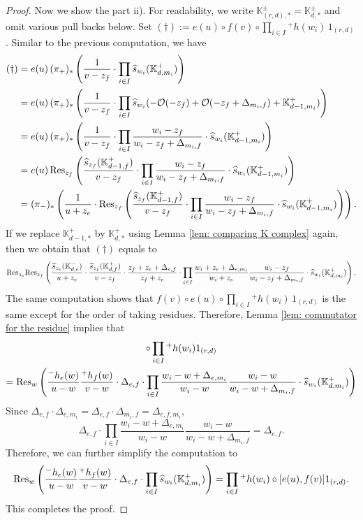 \documentclass[10pt]{amsart}
\newcommand{\BK}{\mathbb{K}}
\newcommand{\CO}{\mathcal{O}}
\newcommand{\+}{{}^+}
\newcommand{\Res}{\textnormal{Res}}
\theoremstyle{definition}
\theoremstyle {definition}
\theoremstyle {definition}
\begin{document}
\begin{proof}
Now we show the part ii). For readability, we write $\BK^\pm_{(r,d),*}=\BK^\pm_{d,*}$ and omit various pull backs below. Set $(\dagger):=e(u)\circ f(v)\circ \prod_{i\in I} {}^{+}h(w_i)\, 1_{(r,d)}$. Similar to the previous computation, we have
\begin{align*}
    (\dagger)
    &=e(u)\,(\pi_+)_*\left(\frac{1}{v-z_f}\cdot \prod_{i\in I} \widehat s_{w_i}(\BK^{+}_{d,m_i})
    \right)\\
    &=e(u)\,(\pi_+)_*\left(\frac{1}{v-z_f}\cdot \prod_{i\in I} 
    \widehat s_{w_i}(-\CO(-z_f)+\CO(-z_f+\Delta_{m_i,f})+\BK^{+}_{d-1,m_i})
    \right)\\
    &=e(u)\,(\pi_+)_*\left(\frac{1}{v-z_f}\cdot \prod_{i\in I} 
    \frac{w_i-z_f}{w_i-z_f+\Delta_{m_i,f}}
    \cdot \widehat s_{w_i}(\BK^{+}_{d-1,m_i})
    \right)\\
    &=e(u)\,\Res_{z_f}\left(\frac{\widehat s_{z_f}(\BK^+_{d-1,f})}{v-z_f}\cdot \prod_{i\in I} 
    \frac{w_i-z_f}{w_i-z_f+\Delta_{m_i,f}}
    \cdot \widehat s_{w_i}(\BK^{+}_{d-1,m_i})
    \right)\\
    &=(\pi_-)_*\left(
    \frac{1}{u+z_e}
    \cdot \Res_{z_f}\left(\frac{\widehat s_{z_f}(\BK^+_{d-1,f})}{v-z_f}\cdot \prod_{i\in I} 
    \frac{w_i-z_f}{w_i-z_f+\Delta_{m_i,f}}
    \cdot \widehat s_{w_i}(\BK^{+}_{d-1,m_i})
    \right)
    \right).
\end{align*}
If we replace $\BK^+_{d-1,*}$ by $\BK^+_{d,*}$ using Lemma \ref{lem: comparing K complex} again, then we obtain that $(\dagger)$ equals to 
$$\Res_{z_e}\Res_{z_f}\left(
    \frac{\widehat s_{z_e}(\BK^-_{d,e})}{u+z_e}\cdot \frac{\widehat s_{z_f}(\BK^+_{d,f})}{v-z_f}\cdot \frac{z_f+z_e+\Delta_{e,f}}{z_f+z_e}\cdot 
    \prod_{i\in I} 
    \frac{w_i+z_e+\Delta_{e,m_i}}{w_i+z_e}\frac{w_i-z_f}{w_i-z_f+\Delta_{m_i,f}}
    \cdot \widehat s_{w_i}(\BK^{+}_{d,m_i})
    \right).
$$
The same computation shows that $f(v)\circ e(u)\circ \prod_{i\in I} {}^{+}h(w_i)\, 1_{(r,d)}$ is the same except for the order of taking residues. Therefore, Lemma \ref{lem: commutator for the residue} implies that
\begin{multline*}
    [e(u),f(v)]\circ\prod_{i\in I}{}^{+}h(w_i)1_{(r,d)}\\
    =\Res_w\left(
    \frac{{}^{-}h_e(w)}{u-w}\frac{{}^{+}h_f(w)}{v-w}\cdot \Delta_{e,f}\cdot \prod_{i\in I} 
    \frac{w_i-w+\Delta_{e,m_i}}{w_i-w}\frac{w_i-w}{w_i-w+\Delta_{m_i,f}}
    \cdot \widehat s_{w_i}(\BK^{+}_{d,m_i})
    \right)
\end{multline*}
Since $\Delta_{e,f}\cdot \Delta_{e,m_i}=\Delta_{e,f}\cdot \Delta_{m_i,f}=\Delta_{e,f,m_i}$, 
$$\Delta_{e,f}\cdot \prod_{i\in I} 
    \frac{w_i-w+\Delta_{e,m_i}}{w_i-w}\frac{w_i-w}{w_i-w+\Delta_{m_i,f}}=\Delta_{e,f}.
$$
Therefore, we can further simplify the computation to 
$$\Res_w\left(
    \frac{{}^{-}h_e(w)}{u-w}\frac{{}^{+}h_f(w)}{v-w}\cdot \Delta_{e,f}\cdot \prod_{i\in I}\widehat s_{w_i}(\BK^{+}_{d,m_i})
    \right)=\prod_{i\in I}{}^{+}h(w_i)\circ [e(u),f(v)]1_{(r,d)}. 
$$
This completes the proof.
\end{proof}
\end{document}
